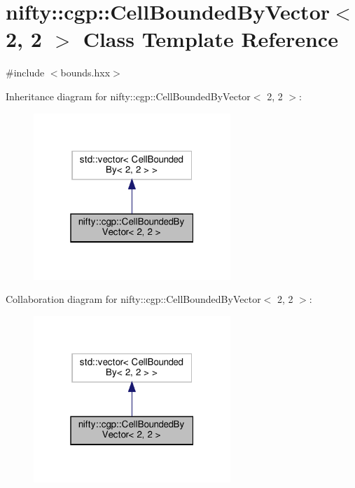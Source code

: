 \hypertarget{classnifty_1_1cgp_1_1CellBoundedByVector_3_012_00_012_01_4}{}\section{nifty\+:\+:cgp\+:\+:Cell\+Bounded\+By\+Vector$<$ 2, 2 $>$ Class Template Reference}
\label{classnifty_1_1cgp_1_1CellBoundedByVector_3_012_00_012_01_4}


{\ttfamily \#include $<$bounds.\+hxx$>$}



Inheritance diagram for nifty\+:\+:cgp\+:\+:Cell\+Bounded\+By\+Vector$<$ 2, 2 $>$\+:
\nopagebreak
\begin{figure}[H]
\begin{center}
\leavevmode
\includegraphics[width=211pt]{classnifty_1_1cgp_1_1CellBoundedByVector_3_012_00_012_01_4__inherit__graph}
\end{center}
\end{figure}


Collaboration diagram for nifty\+:\+:cgp\+:\+:Cell\+Bounded\+By\+Vector$<$ 2, 2 $>$\+:
\nopagebreak
\begin{figure}[H]
\begin{center}
\leavevmode
\includegraphics[width=211pt]{classnifty_1_1cgp_1_1CellBoundedByVector_3_012_00_012_01_4__coll__graph}
\end{center}
\end{figure}
